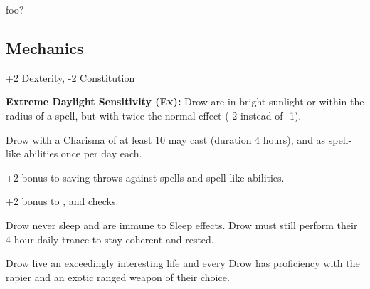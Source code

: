 
foo?

\subsection{Mechanics}

\begin{itemize*}
\item {}
\item {}
\item {}
\item {}
\item +2 Dexterity, -2 Constitution
\item \textbf{Extreme Daylight Sensitivity (Ex):} Drow are  in bright sunlight or within the radius of a  spell, but with twice the normal effect (-2 instead of -1).
\item Drow with a Charisma of at least 10 may cast  (duration 4 hours), and  as spell-like abilities once per day each.
\item +2 bonus to saving throws against spells and spell-like abilities.
\item +2 bonus to , and  checks.
\item Drow never sleep and are immune to Sleep effects. Drow must still perform their 4 hour daily trance to stay coherent and rested.
\item Drow live an exceedingly interesting life and every Drow has proficiency with the rapier and an exotic ranged weapon of their choice.
\item {}
\item {}
\item {}
\end{itemize*}
